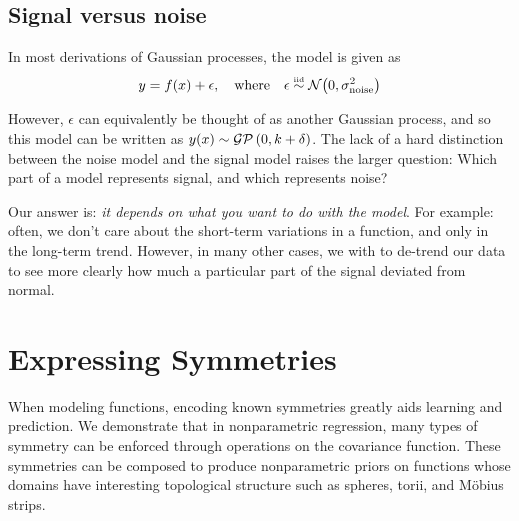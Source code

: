 \subsection{Signal versus noise}

In most derivations of Gaussian processes, the model is given as
%
\begin{align}
y = f(x) + \epsilon, \quad \textnormal{where} \quad \epsilon \overset{\mbox{\tiny iid}}{\sim} \mathcal{N}\!\left(0,\sigma^2_{\textnormal{noise}}\right)
\end{align}

However, $\epsilon$ can equivalently be thought of as another Gaussian process, and so this model can be written as $y(x) \sim \mathcal{GP}\left(0, k + \delta \right)$.  The lack of a hard distinction between the noise model and the signal model raises the larger question:  Which part of a model represents signal, and which represents noise?

Our answer is: \emph{it depends on what you want to do with the model}.  For example: often, we don't care about the short-term variations in a function, and only in the long-term trend.  However, in many other cases, we with to de-trend our data to see more clearly how much a particular part of the signal deviated from normal.






\section{Expressing Symmetries}



When modeling functions, encoding known symmetries greatly aids learning and prediction.  We demonstrate that in nonparametric regression, many types of symmetry can be enforced through operations on the covariance function.  These symmetries can be composed to produce nonparametric priors on functions whose domains have interesting topological structure such as spheres, torii, and M\"{o}bius strips.



